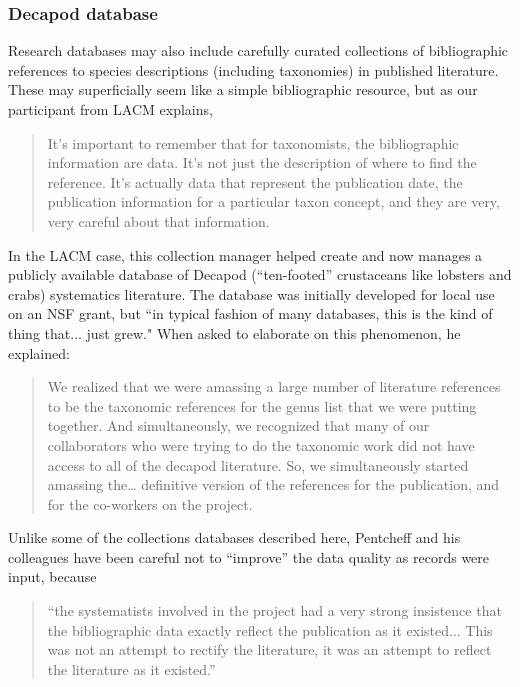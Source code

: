 \subsubsection{Decapod database}
Research databases may also include carefully curated collections of bibliographic references to species descriptions (including taxonomies) in published literature. These may superficially seem like a simple bibliographic resource, but as our participant from LACM explains,
\begin{quote}
It’s important to remember that for taxonomists, the bibliographic information are data. It's not just the description of where to find the reference. It's actually data that represent the publication date, the publication information for a particular taxon concept, and they are very, very careful about that information.
\end{quote}
In the LACM case, this collection manager helped create and now manages a publicly available database of Decapod (“ten-footed” crustaceans like lobsters and crabs) systematics literature. The database was initially developed for local use on an NSF grant, but “in typical fashion of many databases, this is the kind of thing that... just grew." When asked to elaborate on this phenomenon, he explained:
\begin{quote}
We realized that we were amassing a large number of literature references to be the taxonomic references for the genus list that we were putting together. And simultaneously, we recognized that many of our collaborators who were trying to do the taxonomic work did not have access to all of the decapod literature. So, we simultaneously started amassing the… definitive version of the references for the publication, and for the co-workers on the project.
\end{quote}
Unlike some of the collections databases described here, Pentcheff and his colleagues have been careful not to “improve” the data quality as records were input, because \begin{quote}“the systematists involved in the project had a very strong insistence that the bibliographic data exactly reflect the publication as it existed... This was not an attempt to rectify the literature, it was an attempt to reflect the literature as it existed.”\end{quote} 

